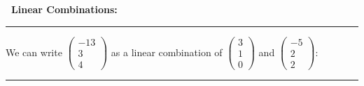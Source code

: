 \documentclass{article}
\newenvironment{explanation}[1]
    {
\par\medskip\textbf{~#1:}\bigskip
    \hrule
    \rmfamily\medskip
    }
    {
    \bigskip
    \hrule
    \medskip
    }
\begin{document}
\begin{explanation}{Linear Combinations}
    We can write $\begin{pmatrix} -13 \\ 3 \\ 4 \end{pmatrix}$ as a linear combination of $\begin{pmatrix} 3 \\ 1 \\ 0 \end{pmatrix}$ and $\begin{pmatrix} -5 \\ 2 \\ 2 \end{pmatrix}$:
\end{explanation}
\end{document}
